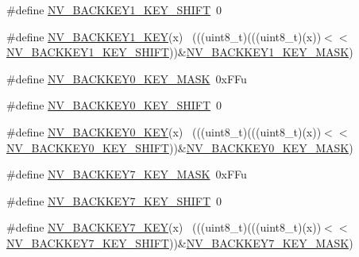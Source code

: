 \begin{DoxyCompactItemize}
\item 
\#define \hyperlink{group___n_v___register___masks_ga71418f17e11f902066ca404fbe473aef}{N\+V\+\_\+\+B\+A\+C\+K\+K\+E\+Y1\+\_\+\+K\+E\+Y\+\_\+\+S\+H\+I\+FT}~0
\item 
\#define \hyperlink{group___n_v___register___masks_gacd7a10179786650c77f0f094f6840a3c}{N\+V\+\_\+\+B\+A\+C\+K\+K\+E\+Y1\+\_\+\+K\+EY}(x)                                          ~(((uint8\+\_\+t)(((uint8\+\_\+t)(x))$<$$<$\hyperlink{group___n_v___register___masks_ga71418f17e11f902066ca404fbe473aef}{N\+V\+\_\+\+B\+A\+C\+K\+K\+E\+Y1\+\_\+\+K\+E\+Y\+\_\+\+S\+H\+I\+FT}))\&\hyperlink{group___n_v___register___masks_ga6cd05d78b113df7f3cb0d11d29931666}{N\+V\+\_\+\+B\+A\+C\+K\+K\+E\+Y1\+\_\+\+K\+E\+Y\+\_\+\+M\+A\+SK})
\item 
\#define \hyperlink{group___n_v___register___masks_gafa0e31ca33d445d47d2fd89785e4ec9b}{N\+V\+\_\+\+B\+A\+C\+K\+K\+E\+Y0\+\_\+\+K\+E\+Y\+\_\+\+M\+A\+SK}~0x\+F\+Fu
\item 
\#define \hyperlink{group___n_v___register___masks_ga381e2b0a778da31fa6c795550e71aed8}{N\+V\+\_\+\+B\+A\+C\+K\+K\+E\+Y0\+\_\+\+K\+E\+Y\+\_\+\+S\+H\+I\+FT}~0
\item 
\#define \hyperlink{group___n_v___register___masks_ga119a9432df0049c7606825aee3a20f31}{N\+V\+\_\+\+B\+A\+C\+K\+K\+E\+Y0\+\_\+\+K\+EY}(x)                                          ~(((uint8\+\_\+t)(((uint8\+\_\+t)(x))$<$$<$\hyperlink{group___n_v___register___masks_ga381e2b0a778da31fa6c795550e71aed8}{N\+V\+\_\+\+B\+A\+C\+K\+K\+E\+Y0\+\_\+\+K\+E\+Y\+\_\+\+S\+H\+I\+FT}))\&\hyperlink{group___n_v___register___masks_gafa0e31ca33d445d47d2fd89785e4ec9b}{N\+V\+\_\+\+B\+A\+C\+K\+K\+E\+Y0\+\_\+\+K\+E\+Y\+\_\+\+M\+A\+SK})
\item 
\#define \hyperlink{group___n_v___register___masks_gac3f2bc7dd55b7951d70a5d1fcb6552b8}{N\+V\+\_\+\+B\+A\+C\+K\+K\+E\+Y7\+\_\+\+K\+E\+Y\+\_\+\+M\+A\+SK}~0x\+F\+Fu
\item 
\#define \hyperlink{group___n_v___register___masks_gad6bef74e61e792dfa5b7d195e4ce5620}{N\+V\+\_\+\+B\+A\+C\+K\+K\+E\+Y7\+\_\+\+K\+E\+Y\+\_\+\+S\+H\+I\+FT}~0
\item 
\#define \hyperlink{group___n_v___register___masks_gad81b2addd996d3f0ee299e252d88b0a9}{N\+V\+\_\+\+B\+A\+C\+K\+K\+E\+Y7\+\_\+\+K\+EY}(x)                                          ~(((uint8\+\_\+t)(((uint8\+\_\+t)(x))$<$$<$\hyperlink{group___n_v___register___masks_gad6bef74e61e792dfa5b7d195e4ce5620}{N\+V\+\_\+\+B\+A\+C\+K\+K\+E\+Y7\+\_\+\+K\+E\+Y\+\_\+\+S\+H\+I\+FT}))\&\hyperlink{group___n_v___register___masks_gac3f2bc7dd55b7951d70a5d1fcb6552b8}{N\+V\+\_\+\+B\+A\+C\+K\+K\+E\+Y7\+\_\+\+K\+E\+Y\+\_\+\+M\+A\+SK})
$$
\end{DoxyCompactItemize}
